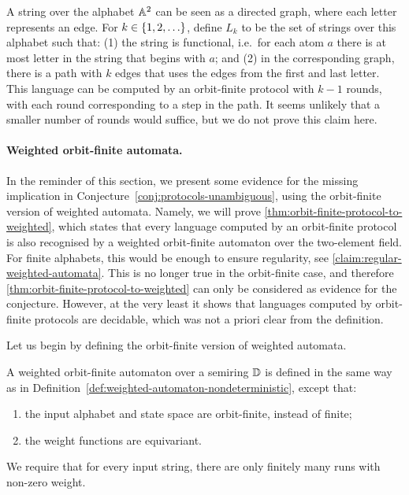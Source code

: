 \begin{myexample}
    A string over the alphabet $\mathbb A^2$ can be seen as a directed graph, where each letter represents an edge. For $k \in \{1,2,\ldots\}$, define  $L_k$ to be the set of strings over this alphabet such that: (1) the string is functional, i.e.~for each atom $a$ there is at most letter in the string that begins with $a$; and (2) in the corresponding graph, there is a path with $k$ edges that uses the edges from the first and last letter. This language can be computed by an orbit-finite protocol with $k-1$ rounds, with each round corresponding to a step in the path. It seems unlikely that a smaller number of rounds would suffice, but we do not prove this claim here. 
\end{myexample}



\paragraph*{Weighted orbit-finite automata.} In the reminder of this section, we present some evidence for the missing implication
in Conjecture~\ref{conj:protocols-unambiguous}, using the orbit-finite version of weighted automata. Namely, we will prove
\cref{thm:orbit-finite-protocol-to-weighted}, which states that every language computed by an orbit-finite protocol is also recognised by a weighted orbit-finite automaton over the two-element field.
For finite alphabets, this would be enough to ensure regularity, see \cref{claim:regular-weighted-automata}. This is no longer true in the orbit-finite case, and therefore \cref{thm:orbit-finite-protocol-to-weighted} can only be considered as evidence for the conjecture. However, at the very least it shows that languages computed by orbit-finite protocols are decidable, which was not a priori clear from the definition.

Let us begin by defining the orbit-finite version of weighted automata. 
\begin{definition}
    \label{def:weighted-orbit-finite-automata}
    A weighted orbit-finite automaton over a semiring $\mathbb D$ is defined in the same way as in Definition~\ref{def:weighted-automaton-nondeterministic}, except that:
    \begin{enumerate}
        \item the input alphabet and state space are orbit-finite, instead of finite;
        \item the weight functions are equivariant.
    \end{enumerate}
     We require that for every input string, there are only finitely many runs with non-zero weight.
\end{definition}

